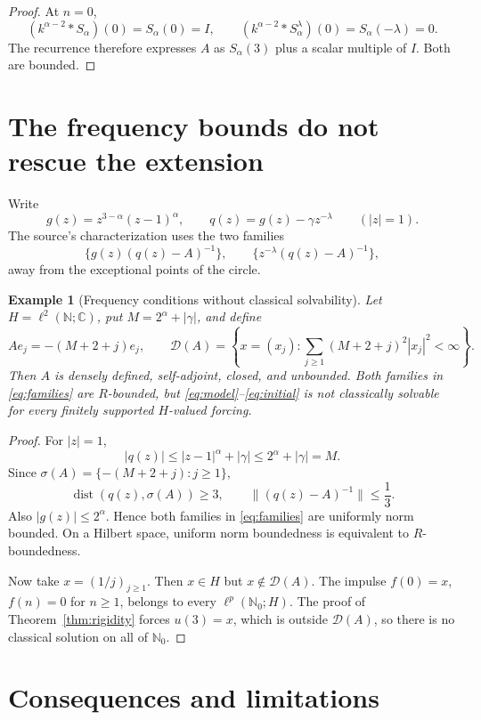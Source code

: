 \documentclass[11pt]{article}
\newtheorem{example}{Example}
\newcommand{\N}{\mathbb N}
\newcommand{\C}{\mathbb C}
\newcommand{\D}{\mathcal D}
\begin{document}
\begin{proof}
At $n=0$,
\[
 (k^{\alpha-2}*S_\alpha)(0)=S_\alpha(0)=I,\qquad
 (k^{\alpha-2}*S_\alpha^\lambda)(0)=S_\alpha(-\lambda)=0.
\]
The recurrence therefore expresses $A$ as $S_\alpha(3)$ plus a scalar
multiple of $I$. Both are bounded.
\end{proof}

\section{The frequency bounds do not rescue the extension}

Write
\[
 g(z)=z^{3-\alpha}(z-1)^\alpha,\qquad
 q(z)=g(z)-\gamma z^{-\lambda}\qquad(|z|=1).
\]
The source's characterization uses the two families
\begin{equation}\label{eq:families}
 \{g(z)(q(z)-A)^{-1}\},\qquad
 \{z^{-\lambda}(q(z)-A)^{-1}\},
\end{equation}
away from the exceptional points of the circle.

\begin{example}[Frequency conditions without classical solvability]
\label{ex:diag}
Let $H=\ell^2(\N;\C)$, put $M=2^\alpha+|\gamma|$, and define
\[
 Ae_j=-(M+2+j)e_j,\qquad
 \D(A)=
 \left\{x=(x_j):\sum_{j\ge1}(M+2+j)^2|x_j|^2<\infty\right\}.
\]
Then $A$ is densely defined, self-adjoint, closed, and unbounded. Both
families in \eqref{eq:families} are $R$-bounded, but
\eqref{eq:model}--\eqref{eq:initial} is not classically solvable for every
finitely supported $H$-valued forcing.
\end{example}

\begin{proof}
For $|z|=1$,
\[
 |q(z)|\le |z-1|^\alpha+|\gamma|\le 2^\alpha+|\gamma|=M.
\]
Since $\sigma(A)=\{-(M+2+j):j\ge1\}$,
\[
 \operatorname{dist}(q(z),\sigma(A))\ge3,\qquad
 \|(q(z)-A)^{-1}\|\le\frac13.
\]
Also $|g(z)|\le2^\alpha$. Hence both families in
\eqref{eq:families} are uniformly norm bounded. On a Hilbert space,
uniform norm boundedness is equivalent to $R$-boundedness.

Now take $x=(1/j)_{j\ge1}$. Then $x\in H$ but $x\notin\D(A)$. The impulse
$f(0)=x$, $f(n)=0$ for $n\ge1$, belongs to every
$\ell^p(\N_0;H)$. The proof of Theorem~\ref{thm:rigidity} forces
$u(3)=x$, which is outside $\D(A)$, so there is no classical solution on all
of $\N_0$.
\end{proof}

\section{Consequences and limitations}
\end{document}
